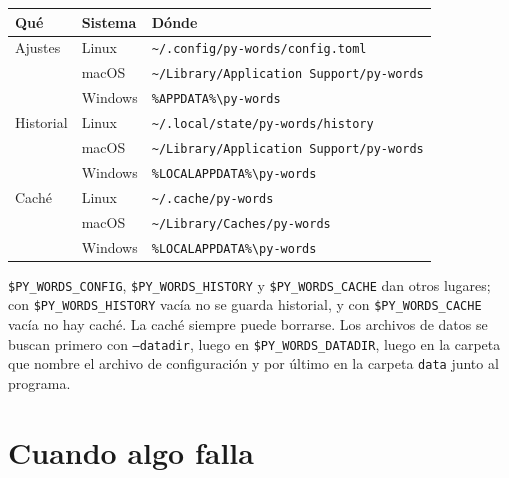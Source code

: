 \documentclass[12pt,
              article,
              oneside
              ]{memoir}
\begin{document}
\begin{longtable}{@{}llp{}@{}}
\toprule
Qué & Sistema & Dónde\\
\midrule
\endhead
Ajustes & Linux & \texttt{\textasciitilde/.config/py-words/config.toml}\\
 & macOS & \texttt{\textasciitilde/Library/Application Support/py-words}\\
 & Windows & \texttt{\%APPDATA\%\textbackslash py-words}\\
\addlinespace
Historial & Linux & \texttt{\textasciitilde/.local/state/py-words/history}\\
 & macOS & \texttt{\textasciitilde/Library/Application Support/py-words}\\
 & Windows & \texttt{\%LOCALAPPDATA\%\textbackslash py-words}\\
\addlinespace
Caché & Linux & \texttt{\textasciitilde/.cache/py-words}\\
 & macOS & \texttt{\textasciitilde/Library/Caches/py-words}\\
 & Windows & \texttt{\%LOCALAPPDATA\%\textbackslash py-words}\\
\bottomrule
\end{longtable}

\noindent{}%
\texttt{\$PY\_WORDS\_CONFIG}, \texttt{\$PY\_WORDS\_HISTORY} y
\texttt{\$PY\_WORDS\_CACHE} dan otros lugares; con
\texttt{\$PY\_WORDS\_HISTORY} vacía no se guarda historial, y con
\texttt{\$PY\_WORDS\_CACHE} vacía no hay caché. La caché siempre puede
borrarse. Los archivos de datos se buscan primero con
\texttt{--datadir}, luego en \texttt{\$PY\_WORDS\_DATADIR}, luego en la
carpeta que nombre el archivo de configuración y por último en la carpeta
\texttt{data} junto al programa.

\section{Cuando algo falla}
\end{document}
